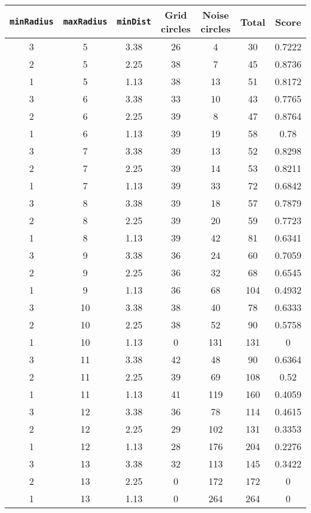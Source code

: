 \documentclass[letterpaper, 12pt]{article}
\begin{document}
\begin{longtable}{|c|c|c|c|c|c|c|}
\hline
\textbf{\texttt{minRadius}} & \textbf{\texttt{maxRadius}} & \textbf{\texttt{minDist}} & \textbf{Grid circles} & \textbf{Noise circles} & \textbf{Total} & \textbf{Score} \\
\hline
3 & 5 & 3.38 & 26 & 4 & 30 & 0.7222 \\
\hline
2 & 5 & 2.25 & 38 & 7 & 45 & 0.8736 \\
\hline
1 & 5 & 1.13 & 38 & 13 & 51 & 0.8172 \\
\hline
3 & 6 & 3.38 & 33 & 10 & 43 & 0.7765 \\
\hline
2 & 6 & 2.25 & 39 & 8 & 47 & 0.8764 \\
\hline
1 & 6 & 1.13 & 39 & 19 & 58 & 0.78 \\
\hline
3 & 7 & 3.38 & 39 & 13 & 52 & 0.8298 \\
\hline
2 & 7 & 2.25 & 39 & 14 & 53 & 0.8211 \\
\hline
1 & 7 & 1.13 & 39 & 33 & 72 & 0.6842 \\
\hline
3 & 8 & 3.38 & 39 & 18 & 57 & 0.7879 \\
\hline
2 & 8 & 2.25 & 39 & 20 & 59 & 0.7723 \\
\hline
1 & 8 & 1.13 & 39 & 42 & 81 & 0.6341 \\
\hline
3 & 9 & 3.38 & 36 & 24 & 60 & 0.7059 \\
\hline
2 & 9 & 2.25 & 36 & 32 & 68 & 0.6545 \\
\hline
1 & 9 & 1.13 & 36 & 68 & 104 & 0.4932 \\
\hline
3 & 10 & 3.38 & 38 & 40 & 78 & 0.6333 \\
\hline
2 & 10 & 2.25 & 38 & 52 & 90 & 0.5758 \\
\hline
1 & 10 & 1.13 & 0 & 131 & 131 & 0 \\
\hline
3 & 11 & 3.38 & 42 & 48 & 90 & 0.6364 \\
\hline
2 & 11 & 2.25 & 39 & 69 & 108 & 0.52 \\
\hline
1 & 11 & 1.13 & 41 & 119 & 160 & 0.4059 \\
\hline
3 & 12 & 3.38 & 36 & 78 & 114 & 0.4615 \\
\hline
2 & 12 & 2.25 & 29 & 102 & 131 & 0.3353 \\
\hline
1 & 12 & 1.13 & 28 & 176 & 204 & 0.2276 \\
\hline
3 & 13 & 3.38 & 32 & 113 & 145 & 0.3422 \\
\hline
2 & 13 & 2.25 & 0 & 172 & 172 & 0 \\
\hline
1 & 13 & 1.13 & 0 & 264 & 264 & 0 \\

\end{longtable}
\end{document}
